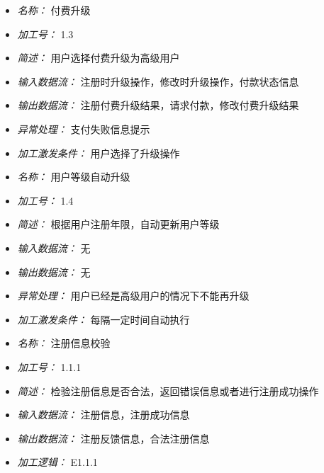 \vspace{-1mm}


\begin{itemize}
\item \textit{名称： } 付费升级
\item \textit{加工号： } 1.3
\item \textit{简述： } 用户选择付费升级为高级用户
\item \textit{输入数据流： } 注册时升级操作，修改时升级操作，付款状态信息 
\item \textit{输出数据流： } 注册付费升级结果，请求付款，修改付费升级结果 
\item \textit{异常处理： } 支付失败信息提示
\item \textit{加工激发条件： } 用户选择了升级操作

\end{itemize}


\vspace{-1mm}


\begin{itemize}
\item \textit{名称： } 用户等级自动升级
\item \textit{加工号： } 1.4
\item \textit{简述： } 根据用户注册年限，自动更新用户等级 
\item \textit{输入数据流： } 无
\item \textit{输出数据流： } 无
\item \textit{异常处理： } 用户已经是高级用户的情况下不能再升级 
\item \textit{加工激发条件： } 每隔一定时间自动执行

\end{itemize}


\vspace{-1mm}


\begin{itemize}
\item \textit{名称： } 注册信息校验
\item \textit{加工号： } 1.1.1
\item \textit{简述： } 检验注册信息是否合法，返回错误信息或者进行注册成功操作 
\item \textit{输入数据流： } 注册信息，注册成功信息
\item \textit{输出数据流： } 注册反馈信息，合法注册信息
\item \textit{加工逻辑： } E1.1.1

\end{itemize}


